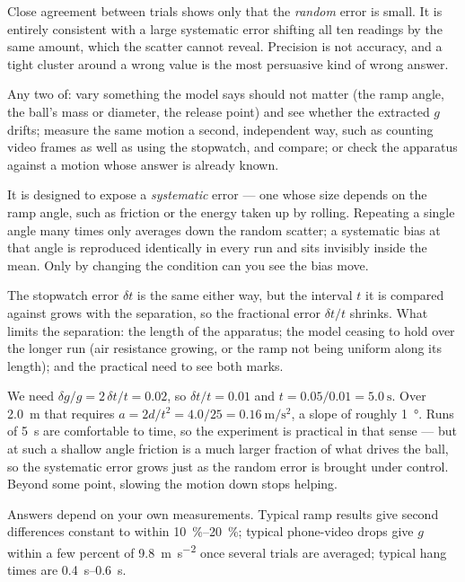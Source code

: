 \documentclass[11pt,twoside,openany]{book}
\newcounter{check}[chapter]
\begin{document}
\begin{description}[leftmargin=2.6em,itemsep=3pt,style=sameline]
  \item[2.73] Close agreement between trials shows only that the \emph{random} error is small. It is entirely consistent with a large systematic error shifting all ten readings by the same amount, which the scatter cannot reveal. Precision is not accuracy, and a tight cluster around a wrong value is the most persuasive kind of wrong answer.
  \item[2.74] Any two of: vary something the model says should not matter (the ramp angle, the ball's mass or diameter, the release point) and see whether the extracted $g$ drifts; measure the same motion a second, independent way, such as counting video frames as well as using the stopwatch, and compare; or check the apparatus against a motion whose answer is already known.
  \item[2.75] It is designed to expose a \emph{systematic} error --- one whose size depends on the ramp angle, such as friction or the energy taken up by rolling. Repeating a single angle many times only averages down the random scatter; a systematic bias at that angle is reproduced identically in every run and sits invisibly inside the mean. Only by changing the condition can you see the bias move.
  \item[2.76] The stopwatch error $\delta t$ is the same either way, but the interval $t$ it is compared against grows with the separation, so the fractional error $\delta t/t$ shrinks. What limits the separation: the length of the apparatus; the model ceasing to hold over the longer run (air resistance growing, or the ramp not being uniform along its length); and the practical need to see both marks.
  \item[2.77] We need $\delta g/g = 2\,\delta t/t = 0.02$, so $\delta t/t = 0.01$ and $t = 0.05/0.01 = \SI{5.0}{\second}$. Over \SI{2.0}{\metre} that requires $a = 2d/t^2 = 4.0/25 = \SI{0.16}{\metre\per\second\squared}$, a slope of roughly \SI{1}{\degree}. Runs of \SI{5}{\second} are comfortable to time, so the experiment is practical in that sense --- but at such a shallow angle friction is a much larger fraction of what drives the ball, so the systematic error grows just as the random error is brought under control. Beyond some point, slowing the motion down stops helping.
  \item[2.78--2.@82] Answers depend on your own measurements. Typical ramp results give second differences constant to within \SIrange{10}{20}{\percent}; typical phone-video drops give $g$ within a few percent of \SI{9.8}{\metre\per\second\squared} once several trials are averaged; typical hang times are \SIrange{0.4}{0.6}{\second}.
\end{description}
\end{document}
